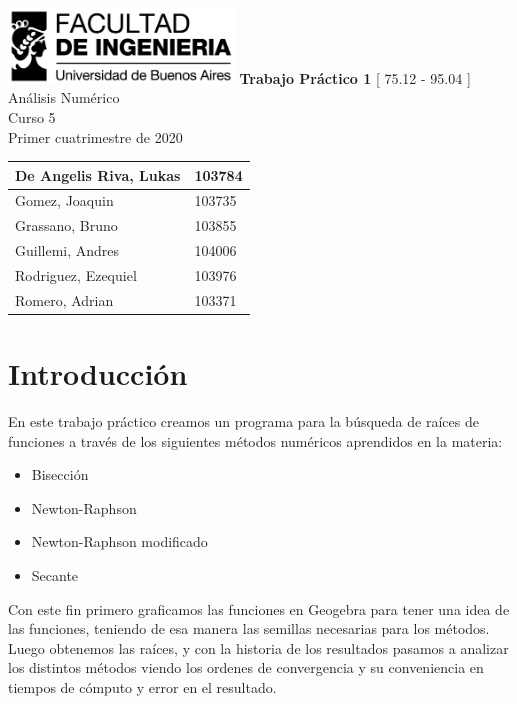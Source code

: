 \documentclass[titlepage,a4paper]{article}
\begin{document}
\begin{titlepage} %
	\hfill\includegraphics[width=6cm]{logofiuba.jpg}
    \centering
    \vfill
    \Huge \textbf{Trabajo Práctico 1}
    \vskip2cm
    \Large [ 75.12 - 95.04 ] Análisis Numérico\\
    Curso 5 \\ 
    Primer cuatrimestre de 2020\\
    \vfill
    \begin{tabular}{ | l | l | } %
      \hline
        De Angelis Riva, Lukas & 103784 \\ \hline
        Gomez, Joaquin & 103735 \\ \hline
        Grassano, Bruno & 103855 \\ \hline
        Guillemi, Andres & 104006\\ \hline 
        Rodriguez, Ezequiel & 103976 \\ \hline
        Romero, Adrian & 103371 \\ \hline
  	\end{tabular}
    \vfill
    \vfill
    \vfill
\end{titlepage}

\tableofcontents %
\newpage

\section{Introducción}\label{sec:intro}
En este trabajo práctico creamos un programa para la búsqueda de raíces de funciones a través de los siguientes métodos numéricos aprendidos en la materia:
\begin{itemize}
    \item Bisección
    \item Newton-Raphson
    \item Newton-Raphson modificado
    \item Secante
\end{itemize}


Con este fin primero graficamos las funciones en Geogebra para tener una idea de las funciones, teniendo de esa manera las semillas necesarias para los métodos. Luego obtenemos las raíces, y con la historia de los resultados pasamos a analizar los distintos métodos viendo los ordenes de convergencia y su conveniencia en tiempos de cómputo y error en el resultado.
\end{document}
